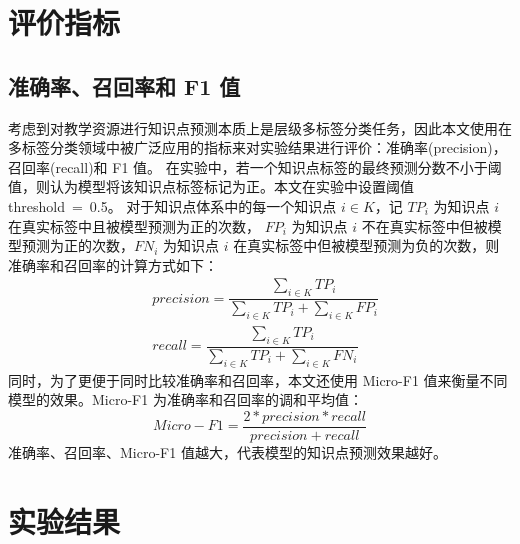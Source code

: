 \section{评价指标}
    \subsection{准确率、召回率和 F1 值}
    考虑到对教学资源进行知识点预测本质上是层级多标签分类任务，因此本文使用在多标签分类领域中被广泛应用的指标来对实验结果进行评价：准确率(precision)，召回率(recall)和 F1 值。
    在实验中，若一个知识点标签的最终预测分数不小于阈值，则认为模型将该知识点标签标记为正。本文在实验中设置阈值 threshold\ =\ 0.5。
    对于知识点体系中的每一个知识点 $i \in K$，记 $TP_i$ 为知识点 $i$ 在真实标签中且被模型预测为正的次数，
    $FP_i$ 为知识点 $i$ 不在真实标签中但被模型预测为正的次数，$FN_i$ 为知识点 $i$ 在真实标签中但被模型预测为负的次数，则准确率和召回率的计算方式如下：
    \begin{equation}
        \begin{aligned}
            &precision = \dfrac{\sum_{i \in K}TP_i}{\sum_{i \in K}TP_i + \sum_{i \in K}FP_i} \\
            &recall = \dfrac{\sum_{i \in K}TP_i}{\sum_{i \in K}TP_i + \sum_{i \in K}FN_i}
        \end{aligned}
    \end{equation}
    同时，为了更便于同时比较准确率和召回率，本文还使用 Micro-F1 值来衡量不同模型的效果。Micro-F1 为准确率和召回率的调和平均值：
    \begin{equation}
        Micro-F1 = \dfrac{2 * precision * recall}{precision + recall}
    \end{equation}
    准确率、召回率、Micro-F1 值越大，代表模型的知识点预测效果越好。


\section{实验结果}
